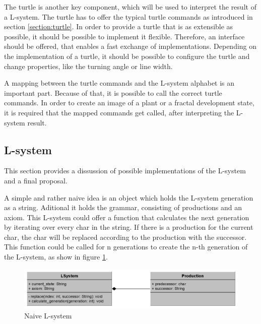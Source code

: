 \documentclass[english]{cpp-hmwk}
\begin{document}
\medskip

\noindent The turtle is another key component, which will be used to interpret the result of a L-system. The turtle has to offer the typical turtle commands as introduced in section \ref{section:turtle}. In order to provide a turtle that is as extensible as possible, it should be possible to implement it flexible. Therefore, an interface should be offered, that enables a fast exchange of implementations. Depending on the implementation of a turtle, it should be possible to configure the turtle and change properties, like the turning angle or line width.

\medskip
\noindent A mapping between the turtle commands and the L-system alphabet is an important part. Because of that, it is possible to call the correct turtle commands. In order to create an image of a plant or a fractal development state, it is required that the mapped commands get called, after interpreting the L-system result.


\subsection{L-system}
\label{section:lsystem_discussion}
This section provides a dissussion of possible implementations of the L-system and a final proposal.

\medskip

\noindent A simple and rather naive idea is an object which holds the L-system generation as a string. Aditional it holds the grammar, consisting of productions and an axiom. This L-system could offer a function that calculates the next generation by iterating over every char in the string. If there is a production for the current char, the char will be replaced according to the production with the successor. This function could be called for n generations to create the n-th generation of the L-system, as show in figure \ref{figure:naive_lsystem}.

\begin{figure}[h!]
	\centering
	\includegraphics[width=1\columnwidth]{../graphs/class_diagram_l_system_naive.png}
	\caption{Naive L-system}
	\label{figure:naive_lsystem}
\end{figure}
\end{document}
